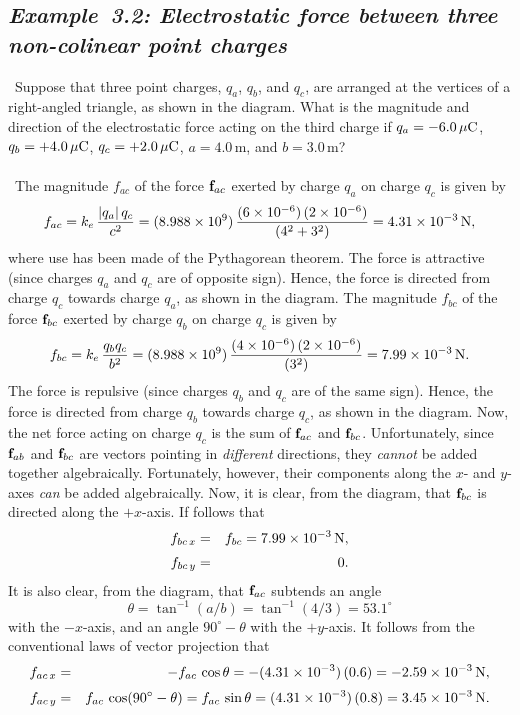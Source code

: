 \subsection*{\em Example~3.2: Electrostatic force between three non-colinear point charges}
\begin{figure*}[b]
\epsfysize=2in
\centerline{}
\end{figure*}
~Suppose that three point charges, $q_a$, $q_b$, and $q_c$, are arranged at the
vertices of a right-angled triangle, as shown in the diagram. What is the magnitude and
direction of the electrostatic force acting on the third charge if
$q_a=-6.0\,\mu{\rm C}$, $q_b=+4.0\,\mu{\rm C}$, $q_c = +2.0\,\mu{\rm C}$,
$a=4.0$\,m, and $b=3.0$\,m?\\
~\\
~The magnitude $f_{ac}$ of the force ${\bf f}_{ac}$ exerted
by charge $q_a$ on charge $q_c$ is given by
$$
f_{ac} = k_e\,\frac{|q_a|\, q_c}{c^2}= (8.988\times 10^9)\,\frac{(6\times 10^{-6})\,(2\times 10^{-6})}
{(4^2+3^2)} = 4.31 \times 10^{-3} \,{\rm N},
$$
where use has been made of the Pythagorean theorem.
The force is attractive (since charges $q_a$ and $q_c$ are of opposite sign). Hence,
the  force is directed from charge $q_c$ towards charge $q_a$, as shown in the diagram.
The magnitude $f_{bc}$ of the force ${\bf f}_{bc}$ exerted
by charge $q_b$ on charge $q_c$ is given by
$$
f_{bc} = k_e\,\frac{q_b q_c}{b^2}= (8.988\times 10^9)\,\frac{(4\times 10^{-6})\,(2\times 10^{-6})}
{(3^2)} = 7.99 \times 10^{-3} \,{\rm N}.
$$
The force is repulsive (since charges $q_b$ and $q_c$ are of the same sign). Hence,
the force is directed from charge $q_b$ towards charge $q_c$, as shown in the diagram.
Now, the net force acting on charge $q_c$ is the sum of ${\bf f}_{ac}$ and ${\bf f}_{bc}$.
Unfortunately, since ${\bf f}_{ab}$ and ${\bf f}_{bc}$ are vectors pointing in {\em different}\/
directions, they {\em cannot}\/ be added together algebraically.  Fortunately, however,
their components along the $x$- and $y$-axes {\em can}\/ be added algebraically.
Now, it is clear, from the diagram, that ${\bf f}_{bc}$ is directed along the
$+x$-axis. If follows that
\begin{eqnarray}
f_{bc\,x} &=& f_{bc} =  7.99 \times 10^{-3} \,{\rm N},\nonumber\\[0.5ex]
f_{bc\,y} &=& 0.\nonumber
\end{eqnarray}
It is also clear, from the diagram, that ${\bf f}_{ac}$ subtends an angle
$$
\theta =\tan^{-1} (a/b) = \tan^{-1}(4/3) = 53.1^\circ
$$
with the $-x$-axis, and an angle $90^\circ-\theta$ with the $+y$-axis.
It follows from the conventional laws of vector projection that
\begin{eqnarray}
f_{ac\,x} &=& -f_{ac}\,\cos\theta =  -(4.31 \times 10^{-3})\,(0.6)=-2.59\times 10^{-3}\,{\rm N},
\nonumber\\[0.5ex]
f_{ac\,y} &=& f_{ac}\,\cos(90^\circ -\theta) = f_{ac} \,\sin\theta = (4.31 \times 10^{-3})\,(0.8) = 3.45 \times 10^{-3}\,{\rm N}.
\nonumber
\end{eqnarray}


